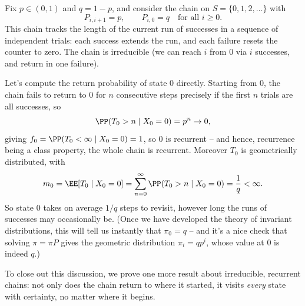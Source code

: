 \documentclass[a4paper]{scrartcl}
\begin{document}
\begin{example}
	Fix $p \in (0, 1)$ and $q = 1 - p$, and consider the chain on $S = \{0, 1, 2, \dots\}$ with
	$$
	P_{i, i + 1} = p, \qquad P_{i, 0} = q \quad \text{for all } i \geq 0.
	$$
	This chain tracks the length of the current run of successes in a sequence of independent trials: each success extends the run, and each failure resets the counter to zero. The chain is irreducible (we can reach $i$ from 0 via $i$ successes, and return in one failure).

	\begin{center}
	\end{center}

	Let's compute the return probability of state 0 directly. Starting from 0, the chain fails to return to 0 for $n$ consecutive steps precisely if the first $n$ trials are all successes, so
	$$
	\PP(T_0 > n \mid X_0 = 0) = p^n \rightarrow 0,
	$$
	giving $f_0 = \PP(T_0 < \infty \mid X_0 = 0) = 1$, so 0 is recurrent -- and hence, recurrence being a class property, the whole chain is recurrent. Moreover $T_0$ is geometrically distributed, with
	$$
	m_0 = \EE[T_0 \mid X_0 = 0] = \sum_{n = 0}^{\infty} \PP(T_0 > n \mid X_0 = 0) = \frac{1}{q} < \infty.
	$$
	So state 0 takes on average $1/q$ steps to revisit, however long the runs of successes may occasionally be. (Once we have developed the theory of invariant distributions, this will tell us instantly that $\pi_0 = q$ -- and it's a nice check that solving $\pi = \pi P$ gives the geometric distribution $\pi_i = qp^i$, whose value at 0 is indeed $q$.)
\end{example}

To close out this discussion, we prove one more result about irreducible, recurrent chains: not only does the chain return to where it started, it visits \emph{every} state with certainty, no matter where it begins.
\end{document}
